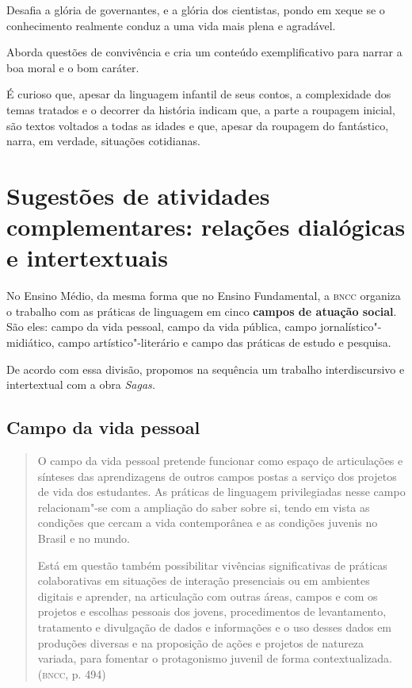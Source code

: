 \documentclass{extarticle}
\begin{document}
Desafia a glória de governantes, e a glória dos cientistas, pondo em
xeque se o conhecimento realmente conduz a uma vida mais plena e
agradável.

Aborda questões de convivência e cria um conteúdo exemplificativo para
narrar a boa moral e o bom caráter.

É curioso que, apesar da linguagem infantil de seus contos, a
complexidade dos temas tratados e o decorrer da história indicam que, a
parte a roupagem inicial, são textos voltados a todas as idades e que,
apesar da roupagem do fantástico, narra, em verdade, situações
cotidianas.

\section{Sugestões de atividades complementares: relações dialógicas e
intertextuais}


No Ensino Médio, da mesma forma que no Ensino Fundamental, a \textsc{bncc}
organiza o trabalho com as práticas de linguagem em cinco \textbf{campos
de atuação social}. São eles: campo da vida pessoal, campo da vida
pública, campo jornalístico"-midiático, campo artístico"-literário e campo
das práticas de estudo e pesquisa.

De acordo com essa divisão, propomos na sequência um trabalho
interdiscursivo e intertextual com a obra \emph{Sagas.}



\subsection{Campo da vida pessoal}

\begin{quote}
O campo da vida pessoal pretende funcionar como espaço de articulações
e sínteses das aprendizagens de outros campos postas a serviço dos
projetos de vida dos estudantes. As práticas de linguagem privilegiadas
nesse campo relacionam"-se com a ampliação do saber sobre si, tendo em
vista as condições que cercam a vida contemporânea e as condições
juvenis no Brasil e no mundo.

Está em questão também possibilitar vivências significativas de práticas
colaborativas em situações de interação presenciais ou em ambientes
digitais e aprender, na articulação com outras áreas, campos e com os
projetos e escolhas pessoais dos jovens, procedimentos de levantamento,
tratamento e divulgação de dados e informações e o uso desses dados em
produções diversas e na proposição de ações e projetos de natureza
variada, para fomentar o protagonismo juvenil de forma
contextualizada. (\textsc{bncc}, p. 494)
\end{quote}
\end{document}
